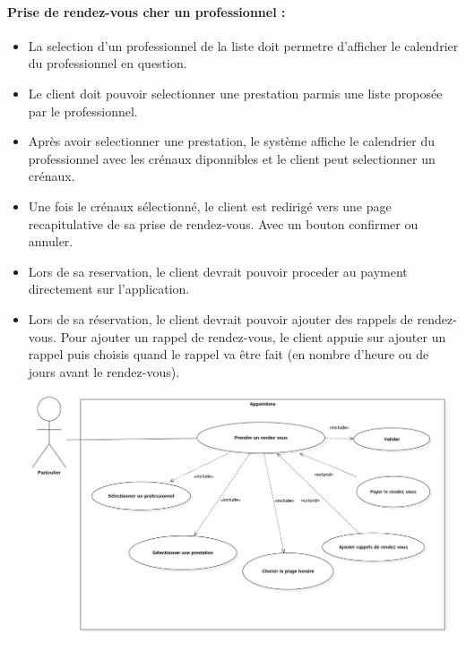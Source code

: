 \documentclass{article}
\begin{document}
\paragraph{Prise de rendez-vous cher un professionnel :}
\begin{itemize}

\item La selection d'un
  professionnel de la liste doit permetre d'afficher le
  calendrier du professionnel en question.
\item Le client doit pouvoir selectionner une prestation parmis une liste
  proposée par le professionnel.
\item Après avoir selectionner une prestation, le système affiche le
  calendrier du professionnel avec les crénaux diponnibles et le
  client peut selectionner un crénaux.
\item Une fois le crénaux sélectionné, le client est redirigé vers
    une page recapitulative de sa prise de rendez-vous. Avec un bouton
    confirmer ou annuler.
\item Lors de sa reservation, le client devrait pouvoir proceder au
  payment directement sur l'application.
\item Lors de sa réservation, le client devrait pouvoir ajouter des
  rappels de rendez-vous. Pour ajouter un rappel de rendez-vous, le
  client appuie sur \og ajouter un rappel \fg{} puis choisis quand le
  rappel va être fait (en nombre d'heure ou de jours avant le
  rendez-vous).

\includegraphics[scale=0.3]{ShematDiagrammes/useCasePriseRdv.jpg}


\end{itemize}
\end{document}
